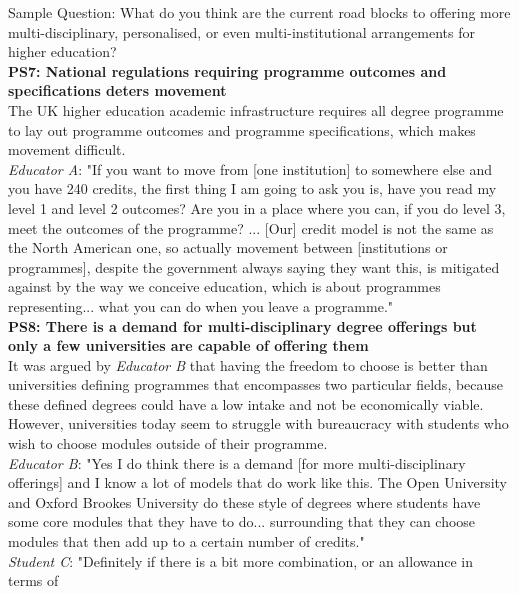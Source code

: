 Sample Question: What do you think are the current road blocks to offering more multi-disciplinary, 
personalised, or even multi-institutional arrangements for higher education?
\vspace{0.25cm}\\
\textbf{PS7: National regulations requiring programme outcomes and specifications deters movement}\\
The UK higher education academic infrastructure requires all degree programme to lay out 
programme outcomes and programme specifications, which makes movement difficult.\\
\textit{Educator A}: "If you want to move from [one institution] to somewhere else and you have 240 credits, 
the first thing I am going to ask you is, have you read my level 1 and level 2 outcomes? Are you 
in a place where you can, if you do level 3, meet the outcomes of the programme? ... 
[Our] credit model is not the same as the North American one, so actually movement 
between [institutions or programmes], despite the government always saying they want this, 
is mitigated against by the way we conceive education, which is about programmes representing... 
what you can do when you leave a programme."
\vspace{0.25cm}\\
\textbf{PS8: There is a demand for multi-disciplinary degree offerings but only a few 
universities are capable of offering them}\\
It was argued by \textit{Educator B} that having the freedom to choose is better than universities 
defining programmes that encompasses two particular fields, because these defined degrees could have 
a low intake and not be economically viable. However, universities today seem to struggle with bureaucracy 
with students who wish to choose modules outside of their programme.\\
\textit{Educator B}: "Yes I do think there is a demand [for more multi-disciplinary offerings] and I know 
a lot of models that do work like this. The Open University and Oxford Brookes University do these 
style of degrees where students have some core modules that they have to do... surrounding that 
they can choose modules that then add up to a certain number of credits." \\
\textit{Student C}: "Definitely if there is a bit more combination, or an allowance in terms of 
